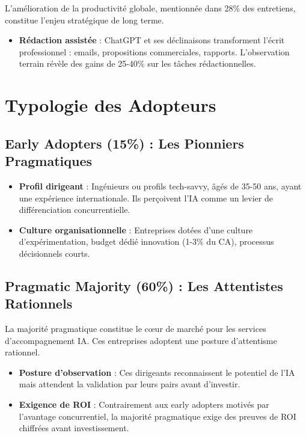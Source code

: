 L'amélioration de la productivité globale, mentionnée dans 28\% des entretiens, constitue l'enjeu stratégique de long terme.

\begin{itemize}
    \item \textbf{Rédaction assistée} : ChatGPT et ses déclinaisons transforment l'écrit professionnel : emails, propositions commerciales, rapports. L'observation terrain révèle des gains de 25-40\% sur les tâches rédactionnelles.
\end{itemize}

\section{Typologie des Adopteurs}

\subsection{Early Adopters (15\%) : Les Pionniers Pragmatiques}

\begin{itemize}
    \item \textbf{Profil dirigeant} : Ingénieurs ou profils tech-savvy, âgés de 35-50 ans, ayant une expérience internationale. Ils perçoivent l'IA comme un levier de différenciation concurrentielle.
    \item \textbf{Culture organisationnelle} : Entreprises dotées d'une culture d'expérimentation, budget dédié innovation (1-3\% du CA), processus décisionnels courts.
\end{itemize}

\subsection{Pragmatic Majority (60\%) : Les Attentistes Rationnels}

La majorité pragmatique constitue le cœur de marché pour les services d'accompagnement IA. Ces entreprises adoptent une posture d'attentisme rationnel.

\begin{itemize}
    \item \textbf{Posture d'observation} : Ces dirigeants reconnaissent le potentiel de l'IA mais attendent la validation par leurs pairs avant d'investir.
    \item \textbf{Exigence de ROI} : Contrairement aux early adopters motivés par l'avantage concurrentiel, la majorité pragmatique exige des preuves de ROI chiffrées avant investissement.
\end{itemize}

